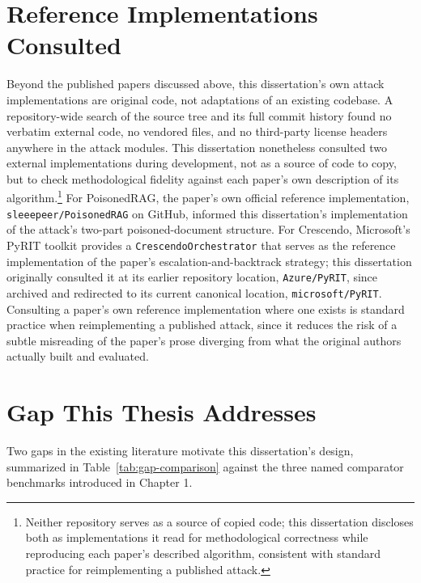 \section{Reference Implementations Consulted}
Beyond the published papers discussed above, this dissertation's own
attack implementations are original code, not adaptations of an
existing codebase. A repository-wide search of the source tree and its
full commit history found no verbatim external code, no vendored files,
and no third-party license headers anywhere in the attack modules. This
dissertation nonetheless consulted two external implementations during
development, not as a source of code to copy, but to check
methodological fidelity against each paper's own description of its
algorithm.\footnote{Neither repository serves as a source of copied
code; this dissertation discloses both as implementations it read for
methodological correctness while reproducing each paper's described
algorithm, consistent with standard practice for reimplementing a
published attack.} For PoisonedRAG, the paper's own official reference
implementation, \texttt{sleeepeer/PoisonedRAG} on GitHub, informed this
dissertation's implementation of the attack's two-part poisoned-document
structure. For Crescendo, Microsoft's PyRIT toolkit provides a
\texttt{CrescendoOrchestrator} that serves as the reference
implementation of the paper's escalation-and-backtrack strategy; this
dissertation originally consulted it at its earlier repository location,
\texttt{Azure/PyRIT}, since archived and redirected to its current
canonical location, \texttt{microsoft/PyRIT}. Consulting a paper's own
reference implementation where one exists is standard practice when
reimplementing a published attack, since it reduces the risk of a
subtle misreading of the paper's prose diverging from what the original
authors actually built and evaluated.

\section{Gap This Thesis Addresses}

Two gaps in the existing literature motivate this dissertation's design,
summarized in Table~\ref{tab:gap-comparison} against the three named
comparator benchmarks introduced in Chapter 1.

